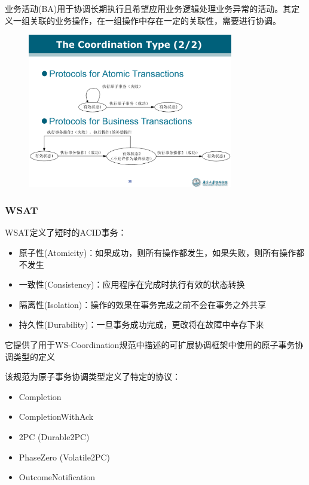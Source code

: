 业务活动(BA)用于协调长期执行且希望应用业务逻辑处理业务异常的活动。其定义一组关联的业务操作，在一组操作中存在一定的关联性，需要进行协调。
\begin{figure}[H]
    \vspace{-0.5em}
	\centering
	\includegraphics[width=0.8\textwidth]{images/WSBA.pdf}
    \vspace{-1.5em}
\end{figure}

\subsubsection{WSAT}
WSAT定义了短时的ACID事务：
\begin{itemize}
    \item 原子性(Atomicity)：如果成功，则所有操作都发生，如果失败，则所有操作都不发生
    \item 一致性(Consistency)：应用程序在完成时执行有效的状态转换
    \item 隔离性(Isolation)：操作的效果在事务完成之前不会在事务之外共享
    \item 持久性(Durability)：一旦事务成功完成，更改将在故障中幸存下来
\end{itemize}

它提供了用于WS-Coordination规范中描述的可扩展协调框架中使用的原子事务协调类型的定义

该规范为原子事务协调类型定义了特定的协议：
\vspace{-0.8em}
\begin{multicols}{3}
    \begin{itemize}
        \item Completion
        \item CompletionWithAck
        \item 2PC (Durable2PC)
        \item PhaseZero (Volatile2PC)
        \item OutcomeNotification
    \end{itemize}
\end{multicols}
\vspace{-1em}

